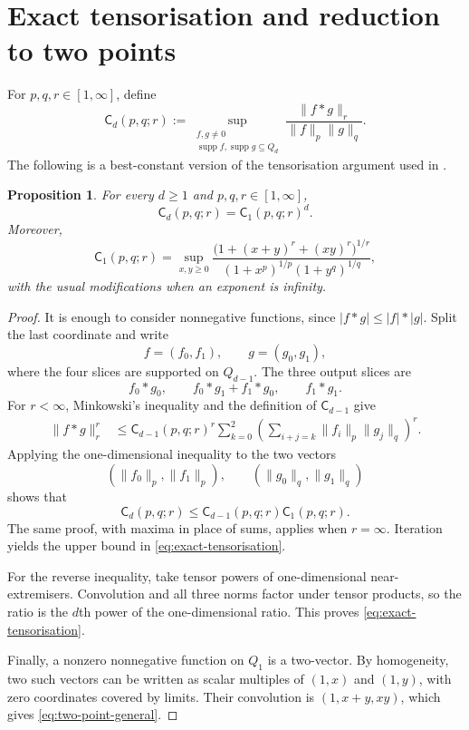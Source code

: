 \documentclass[11pt,reqno]{amsart}
\numberwithin{equation}{section}
\newtheorem{proposition}[proposition]{Proposition}
\theoremstyle{definition}
\theoremstyle{remark}
\newcommand{\supp}{\operatorname{supp}}
\newcommand{\Cpqr}{\mathsf C}
\begin{document}
\section{Exact tensorisation and reduction to two points}\label{sec:tensorisation}

For $p,q,r\in[1,\infty]$, define
\begin{equation}\label{eq:C-d-general}
  \Cpqr_d(p,q;r)
  :=\sup_{\substack{f,g\ne0\\ \supp f,\supp g\subseteq Q_d}}
  \frac{\|f*g\|_r}{\|f\|_p\|g\|_q}.
\end{equation}
The following is a best-constant version of the tensorisation argument used in \cite{BIMP}.

\begin{proposition}\label{prop:tensorisation}
For every $d\ge1$ and $p,q,r\in[1,\infty]$,
\begin{equation}\label{eq:exact-tensorisation}
  \Cpqr_d(p,q;r)=\Cpqr_1(p,q;r)^d.
\end{equation}
Moreover,
\begin{equation}\label{eq:two-point-general}
  \Cpqr_1(p,q;r)
  =\sup_{x,y\ge0}
  \frac{\bigl(1+(x+y)^r+(xy)^r\bigr)^{1/r}}
  {(1+x^p)^{1/p}(1+y^q)^{1/q}},
\end{equation}
with the usual modifications when an exponent is infinity.
\end{proposition}

\begin{proof}
It is enough to consider nonnegative functions, since $|f*g|\le |f|*|g|$.  Split the last coordinate and write
\[
  f=(f_0,f_1),\qquad g=(g_0,g_1),
\]
where the four slices are supported on $Q_{d-1}$.  The three output slices are
\[
  f_0*g_0,\qquad f_0*g_1+f_1*g_0,\qquad f_1*g_1.
\]
For $r<\infty$, Minkowski's inequality and the definition of $\Cpqr_{d-1}$ give
\begin{align*}
  \|f*g\|_r^r
  &\le \Cpqr_{d-1}(p,q;r)^r
  \sum_{k=0}^2
  \left(
    \sum_{i+j=k}\|f_i\|_p\|g_j\|_q
  \right)^r.
\end{align*}
Applying the one-dimensional inequality to the two vectors
\[
  (\|f_0\|_p,\|f_1\|_p),
  \qquad
  (\|g_0\|_q,\|g_1\|_q)
\]
shows that
\[
  \Cpqr_d(p,q;r)
  \le \Cpqr_{d-1}(p,q;r)\Cpqr_1(p,q;r).
\]
The same proof, with maxima in place of sums, applies when $r=\infty$.  Iteration yields the upper bound in \eqref{eq:exact-tensorisation}.

For the reverse inequality, take tensor powers of one-dimensional near-extremisers.  Convolution and all three norms factor under tensor products, so the ratio is the $d$th power of the one-dimensional ratio.  This proves \eqref{eq:exact-tensorisation}.

Finally, a nonzero nonnegative function on $Q_1$ is a two-vector.  By homogeneity, two such vectors can be written as scalar multiples of $(1,x)$ and $(1,y)$, with zero coordinates covered by limits.  Their convolution is $(1,x+y,xy)$, which gives \eqref{eq:two-point-general}.
\end{proof}
\end{document}
